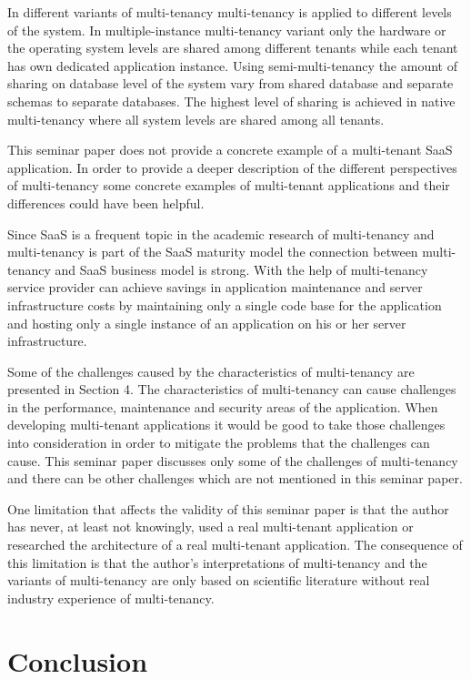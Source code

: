 \documentclass[conference]{sasmoota2017}
\begin{document}
In different variants of multi-tenancy multi-tenancy is applied to different levels of the system. In multiple-instance multi-tenancy variant only the hardware or the operating system levels are shared among different tenants while each tenant has own dedicated application instance. Using semi-multi-tenancy the amount of sharing on database level of the system vary from shared database and separate schemas to separate databases. The highest level of sharing is achieved in native multi-tenancy where all system levels are shared among all tenants. 

This seminar paper does not provide a concrete example of a multi-tenant SaaS application. In order to provide a deeper description of the different perspectives of multi-tenancy some concrete examples of multi-tenant applications and their differences could have been helpful. 

Since SaaS is a frequent topic in the academic research of multi-tenancy and multi-tenancy is part of the SaaS maturity model the connection between multi-tenancy and SaaS business model is strong. With the help of multi-tenancy service provider can achieve savings in application maintenance and server infrastructure costs by maintaining only a single code base for the application and hosting only a single instance of an application on his or her server infrastructure. 

Some of the challenges caused by the characteristics of multi-tenancy are presented in Section 4. The characteristics of multi-tenancy can cause challenges in the performance, maintenance and security areas of the application. When developing multi-tenant applications it would be good to take those challenges into consideration in order to mitigate the problems that the challenges can cause. This seminar paper discusses only some of the challenges of multi-tenancy and there can be other challenges which are not mentioned in this seminar paper.

One limitation that affects the validity of this seminar paper is that the author has never, at least not knowingly, used a real multi-tenant application or researched the architecture of a real multi-tenant application. The consequence of this limitation is that the author's interpretations of multi-tenancy and the variants of multi-tenancy are only based on scientific literature without real industry experience of multi-tenancy. 

\section{Conclusion}
\end{document}
